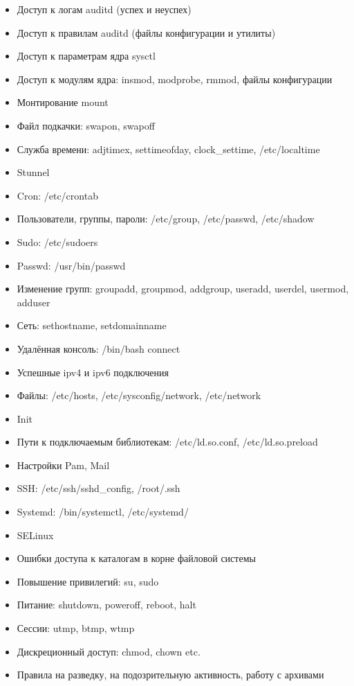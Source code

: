 \begin{itemize}
    \item Доступ к логам auditd (успех и неуспех)
    \item Доступ к правилам auditd (файлы конфигурации и утилиты)
    \item Доступ к параметрам ядра sysctl
    \item Доступ к модулям ядра: insmod, modprobe, rmmod, файлы конфигурации
    \item Монтирование mount
    \item Файл подкачки: swapon, swapoff
    \item Служба времени: adjtimex, settimeofday, clock\_settime, /etc/localtime
    \item Stunnel
    \item Cron: /etc/crontab
    \item Пользователи, группы, пароли: /etc/group, /etc/passwd, /etc/shadow
    \item Sudo: /etc/sudoers
    \item Passwd: /usr/bin/passwd
    \item Изменение групп: groupadd, groupmod, addgroup, useradd, userdel, usermod, adduser
    \item Сеть: sethostname, setdomainname
    \item Удалённая консоль: /bin/bash connect
    \item Успешные ipv4 и ipv6 подключения
    \item Файлы: /etc/hosts, /etc/sysconfig/network, /etc/network
    \item Init
    \item Пути к подключаемым библиотекам: /etc/ld.so.conf, /etc/ld.so.preload
    \item Настройки Pam, Mail
    \item SSH: /etc/ssh/sshd\_config, /root/.ssh
    \item Systemd: /bin/systemctl, /etc/systemd/
    \item SELinux
    \item Ошибки доступа к каталогам в корне файловой системы
    \item Повышение привилегий: su, sudo
    \item Питание: shutdown, poweroff, reboot, halt
    \item Сессии: utmp, btmp, wtmp
    \item Дискреционный доступ: chmod, chown etc.
    \item Правила на разведку, на подозрительную активность, работу с архивами

\end{itemize}
